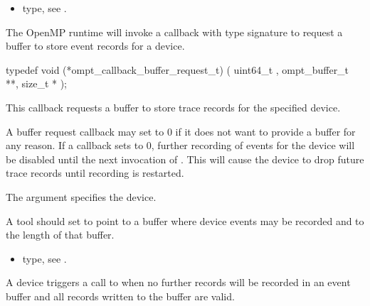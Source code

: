\crossreferences
\begin{itemize}
\item {} type, see
.
\end{itemize}


\label{sec:ompt_callback_buffer_request_t}

\summary
The OpenMP runtime will invoke a callback with type signature
 to request a
buffer to store event records for a device.

\format

\begin{ccppspecific}
\begin{omptCallback}
typedef void (*ompt_callback_buffer_request_t) (
  uint64_t ,
  ompt_buffer_t **,
  size_t *
);
\end{omptCallback}
\end{ccppspecific}


\descr
This callback requests a buffer to store trace records for the
specified device.

A buffer request callback may set  to 0 if it does not
want to provide a buffer for any reason. If a callback sets
 to 0, further recording of events for the device will be
disabled until the next invocation of .  This
will cause the device to drop future trace records until recording is
restarted.

\argdesc

The argument  specifies the device.

A tool should set  to point to a buffer where device events
may be recorded and  to the length of that buffer.

\crossreferences
\begin{itemize}
\item {} type, see
.
\end{itemize}

\label{sec:ompt_callback_buffer_complete_t}
\summary
A device triggers a call to  when no further records will be recorded in an event buffer and all records written to the buffer are valid.


